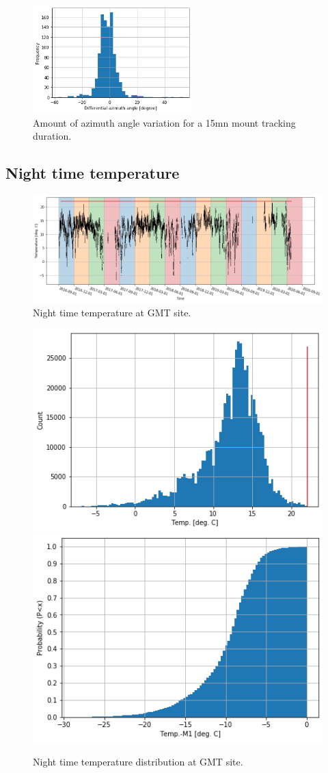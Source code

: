 \documentclass{gmto}
\begin{document}
\begin{figure}
  \centering
  \includegraphics[width=0.55\textwidth]{diff_az_angle.png}
  \caption{Amount of azimuth angle variation for a 15mn mount tracking
    duration.}
  \label{fig:14}
\end{figure}

\subsection{Night time temperature}
\label{sec:night-temp}

\begin{figure}
  \centering
  \includegraphics[width=\linewidth]{temperature_seasoned.png}
  \caption{Night time temperature at GMT site.}
  \label{fig:1}
\end{figure}

\begin{figure}
  \centering
  \includegraphics[width=0.495\linewidth]{temperature_distribution.png}
  \includegraphics[width=0.495\linewidth]{temperature_M1_cumdist.png}
  \caption{Night time temperature distribution at GMT site.}
  \label{fig:2}
\end{figure}

\printbibliography
\end{document}
